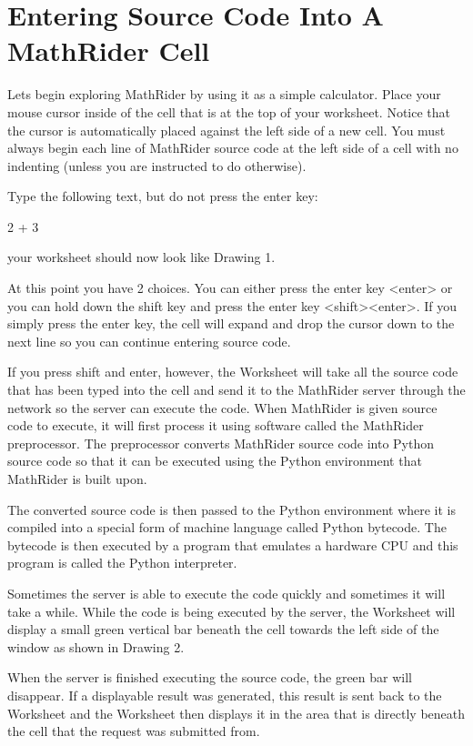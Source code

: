 \documentclass[12pt,oneside]{book}
\begin{document}
\section[Entering Source Code Into A MathRider Cell]{Entering Source Code Into A MathRider Cell}

Lets begin exploring MathRider by using it as a simple calculator. Place your mouse cursor inside of the cell that is at the top of your worksheet. Notice that the cursor is automatically placed against the left side of a new cell. You must always begin each line of MathRider source code at the left side of a cell with no indenting (unless you are instructed to do otherwise). 

Type the following text, but do not press the enter key:


2 + 3


your worksheet should now look like Drawing 1.

At this point you have 2 choices. You can either press the enter key {\textless}enter{\textgreater} or you can hold down the shift key and press the enter key {\textless}shift{\textgreater}{\textless}enter{\textgreater}. If you simply press the enter key, the cell will expand and drop the cursor down to the next line so you can continue entering source code. 

If you press shift and enter, however, the Worksheet will take all the source code that has been typed into the cell and send it to the MathRider server through the network so the server can execute the code. When MathRider is given source code to execute, it will first process it using software called the MathRider preprocessor. The preprocessor converts MathRider source code into Python source code so that it can be executed using the Python environment that MathRider is built upon. 

The converted source code is then passed to the Python environment where it is compiled into a special form of machine language called Python bytecode. The bytecode is then executed by a program that emulates a hardware CPU and this program is called the Python interpreter.  

Sometimes the server is able to execute the code quickly and sometimes it will take a while. While the code is being executed by the server, the Worksheet will display a small green vertical bar beneath the cell towards the left side of the window as shown in Drawing 2. 


When the server is finished executing the source code, the green bar will disappear. If a displayable result was generated, this result is sent back to the Worksheet and the Worksheet then displays it in the area that is directly beneath the cell that the request was submitted from. 
\end{document}

